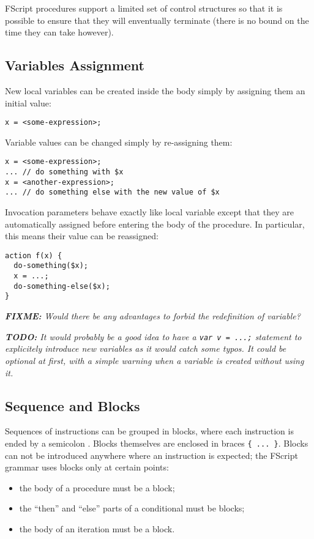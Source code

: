 \documentclass[a4paper,12pt]{report}
\newcommand{\fixme}[1]{\textit{\textbf{FIXME:} #1}}
\newcommand{\todo}[1]{\textit{\textbf{TODO:} #1}}
\begin{document}
FScript procedures support a limited set of control structures so that it is possible to
ensure that they will enventually terminate (there is no bound on the time they can take
however).

\subsection{Variables Assignment}
\label{sec:assignment}

New local variables can be created inside the body simply by assigning them an initial
value:
\begin{verbatim}
x = <some-expression>;
\end{verbatim}

Variable values can be changed simply by re-assigning them:
\begin{verbatim}
x = <some-expression>;
... // do something with $x
x = <another-expression>;
... // do something else with the new value of $x
\end{verbatim}

Invocation parameters behave exactly like local variable except that they are
automatically assigned before entering the body of the procedure. In particular, this
means their value can be reassigned:
\begin{verbatim}
action f(x) {
  do-something($x);
  x = ...;
  do-something-else($x);
}
\end{verbatim}

\fixme{Would there be any advantages to forbid the redefinition of variable?}

\todo{It would probably be a good idea to have a \texttt{var v = ...;} statement to
  explicitely introduce new variables as it would catch some typos. It could be optional
  at first, with a simple warning when a variable is created without using it.}

\subsection{Sequence and Blocks}
\label{sec:sequence}

Sequences of instructions can be grouped in blocks, where each instruction is ended by a
semicolon \lit{;}. Blocks themselves are enclosed in braces \verb+{ ... }+. Blocks can not
be introduced anywhere where an instruction is expected; the FScript grammar uses blocks
only at certain points:
\begin{itemize}
\item the body of a procedure must be a block;
\item the ``then'' and ``else'' parts of a conditional must be blocks;
\item the body of an iteration must be a block.
\end{itemize}
\end{document}
